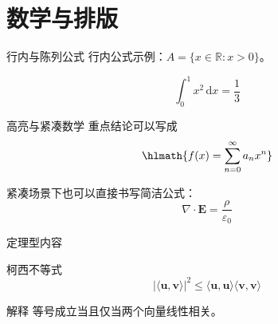 \section{数学与排版}

\begin{frame}{行内与陈列公式}
  行内公式示例：$A = \{x \in \mathbb{R} : x > 0\}$。

  \begin{equation}
    \int_{0}^{1} x^2 \, \mathrm{d}x = \frac{1}{3}
  \end{equation}
\end{frame}

\begin{frame}{高亮与紧凑数学}
  重点结论可以写成
  \[
    \hlmath{f(x) = \sum_{n=0}^{\infty} a_n x^n}
  \]

  紧凑场景下也可以直接书写简洁公式：
  \[
    \nabla \cdot \mathbf{E} = \frac{\rho}{\varepsilon_0}
  \]
\end{frame}

\begin{frame}{定理型内容}
  \begin{block}{柯西不等式}
    \[
      |\langle \mathbf{u}, \mathbf{v} \rangle|^2
      \le \langle \mathbf{u}, \mathbf{u} \rangle
      \langle \mathbf{v}, \mathbf{v} \rangle
    \]
  \end{block}
  \begin{exampleblock}{解释}
    等号成立当且仅当两个向量线性相关。
  \end{exampleblock}
\end{frame}
